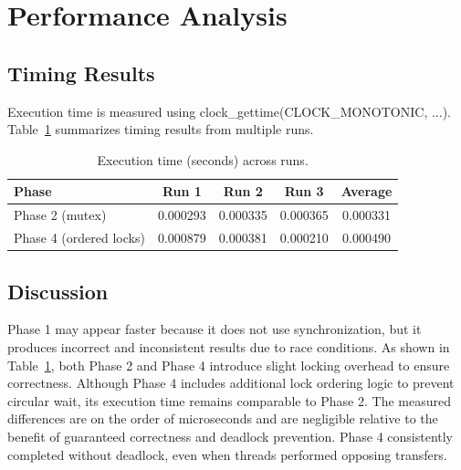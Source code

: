 \documentclass[12pt]{article}
\begin{document}
\section{Performance Analysis}

\subsection{Timing Results}
Execution time is measured using clock\_gettime(CLOCK\_MONOTONIC, ...).
Table~\ref{tab:timings} summarizes timing results from multiple runs.

\begin{table}[H]
\centering
\caption{Execution time (seconds) across runs.}
\label{tab:timings}
\begin{tabular}{@{}lcccc@{}}
\toprule
Phase & Run 1 & Run 2 & Run 3 & Average \\ \midrule
Phase 2 (mutex) & 0.000293 & 0.000335 & 0.000365 & 0.000331 \\
Phase 4 (ordered locks) & 0.000879 & 0.000381 & 0.000210 & 0.000490 \\
\bottomrule
\end{tabular}
\end{table}

\subsection{Discussion}

Phase 1 may appear faster because it does not use synchronization, but it produces
incorrect and inconsistent results due to race conditions. As shown in Table~\ref{tab:timings},
both Phase 2 and Phase 4 introduce slight locking overhead to ensure correctness.
Although Phase 4 includes additional lock ordering logic to prevent circular wait,
its execution time remains comparable to Phase 2. The measured differences are on the
order of microseconds and are negligible relative to the benefit of guaranteed
correctness and deadlock prevention. Phase 4 consistently completed without
deadlock, even when threads performed opposing transfers.
\end{document}
